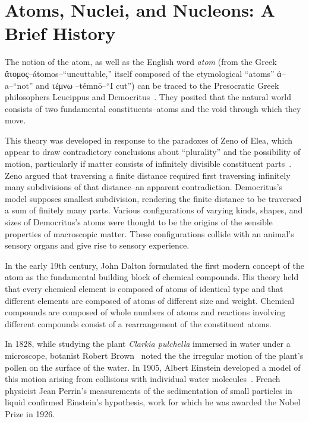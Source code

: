 \section{Atoms, Nuclei, and Nucleons: A Brief History}

The notion of the atom, as well as the English word \textit{atom}
(from the Greek \textgreek{ἄτομος}--átomos--``uncuttable,''
itself composed of the etymological ``atoms''
\textgreek{ἀ}--a--``not''
and
\textgreek{τέμνω }--témnō--``I cut'') can be traced to the Presocratic Greek
philosophers Leucippus and Democritus~\cite{sep-atomism-ancient}.
They posited that the natural world consists of two fundamental
constituents--atoms and the void through which they move.


This theory was developed in response to the paradoxes of Zeno of
Elea, which appear to draw contradictory conclusions about ``plurality'' and
the possibility of motion, particularly if matter consists of infinitely divisible
constituent parts~\cite{sep-paradox-zeno}.
Zeno argued that traversing a finite distance required first traversing
infinitely many subdivisions of that distance--an apparent contradiction.
Democritus's model supposes smallest subdivision, rendering the finite distance
to be traversed a sum of finitely many parts.
Various configurations of varying kinds, shapes, and sizes of Democritus's
atoms were thought to be the origins of the sensible properties of macroscopic
matter.
These configurations collide with an animal's sensory organs and give rise to
sensory experience.


In the early 19th century, John Dalton formulated the first modern concept of
the atom as the fundamental building block of chemical compounds.
His theory held that every chemical element is composed of atoms of identical
type and that different elements are composed of atoms of different size and
weight.
Chemical compounds are composed of whole numbers of atoms and reactions
involving different compounds consist of a rearrangement of the constituent
atoms.


In 1828, while studying the plant \textit{Clarkia pulchella} immersed in water
under a microscope,
botanist Robert Brown~\cite{Brown_1828} noted the
the irregular motion of the plant's pollen on the surface of the water.
In 1905, Albert Einstein developed a model of this motion  arising from
collisions with individual water molecules~\cite{Einstein_1905}.
French physicist Jean Perrin's measurements of the sedimentation of small
particles in liquid confirmed Einstein's hypothesis, work for which he was
awarded the Nobel Prize in 1926.


